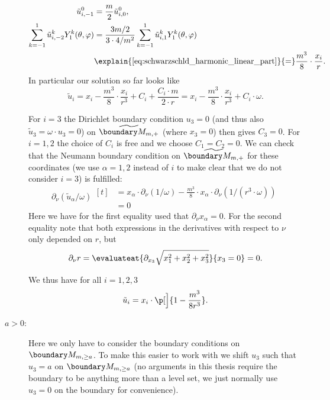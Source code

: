 \documentclass[titlepage,numbers=noenddot,headinclude,oneside,%
footinclude=true,cleardoublepage=empty,%
BCOR=5mm,paper=a4,fontsize=11pt,%
english,%
]{scrartcl}
\begin{document}
\begin{description}
\begin{align*}
        \tilde{u}^0_{i,-1}&=\frac{m}{2}\tilde{u}_{i,0}^0,\\
        \sum_{k=-1}^{1}\tilde{u}^k_{i,-2}Y^k_1(\theta,\varphi)&\begin{aligned}[t]
            &=\frac{3m/2}{3\cdot 4/m^2}\sum_{k=-1}^{1}\tilde{u}^k_{i,1}Y^k_1(\theta,\varphi)\\
            &\explain{\cref{eq:schwarzschld_harmonic_linear_part}}{=}\frac{m^3}{8}\cdot \frac{x_i}{r}.
        \end{aligned}
    \end{align*}
    In particular our solution so far looks like
    \begin{equation*}
        \tilde{u}_i=x_i-\frac{m^3}{8}\cdot \frac{x_i}{r^3}+C_i+\frac{C_i\cdot m}{2\cdot r}=x_i-\frac{m^3}{8}\cdot \frac{x_i}{r^3}+C_i\cdot \omega.
    \end{equation*}
    
    For \( i=3 \) the Dirichlet boundary condition \( u_3=0 \) (and thus also \( \tilde{u}_3=\omega\cdot u_3=0 \)) on \( \schwarzschildboundary \) (where \( x_3=0 \)) then gives \( C_3=0 \). For \( i=1,2 \) the choice of \( C_i \) is free and we choose \( C_1=C_2=0 \). We can check that the Neumann boundary condition on \( \schwarzschildboundary \) for these coordinates (we use \( \alpha=1,2 \) instead of \( i \) to make clear that we do not consider \( i=3 \)) is fulfilled:
    \begin{equation*}
        \partial_\nu (\tilde{u}_{\alpha}/\omega)\begin{aligned}[t]
            &=x_\alpha\cdot \partial_\nu (1/\omega)-\frac{m^3}{8}\cdot x_\alpha \cdot \partial_\nu(1/(r^3\cdot \omega))\\
            &=0
        \end{aligned}
    \end{equation*}
    Here we have for the first equality used that \( \partial_\nu x_\alpha=0 \). For the second equality note that both expressions in the derivatives with respect to \( \nu \) only depended on \( r \), but 
    \begin{equation*}
        \partial_\nu r=\evaluateat{\partial_{x_3} \sqrt{x_1^2+x_2^2+x_3^2}}{x_3=0}=0.
    \end{equation*}

    We thus have for all \( i=1,2,3 \)
    \begin{equation*}
        \tilde{u}_i=x_i\cdot \p[\Big]{1-\frac{m^3}{8r^3}}.
    \end{equation*}
    \item[\( a>0 \):] Here we only have to consider the boundary conditions on \( \modifiedschwarzschildboundary \). To make this easier to work with we shift \( u_3 \) such that \( u_3=a \) on \( \modifiedschwarzschildboundary \) (no arguments in this thesis require the boundary to be anything more than a level set, we just normally use \( u_3=0 \) on the boundary for convenience).
    

\end{description}
\end{document}

